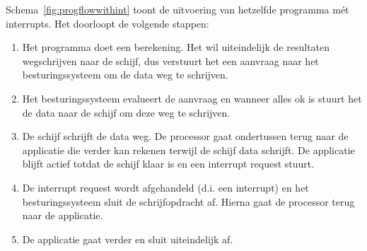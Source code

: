 Schema~\ref{fig:progflowwithint} toont de uitvoering van hetzelfde programma m\'et interrupts. Het doorloopt de volgende stappen:

\begin{enumerate}
\item Het programma doet een berekening. Het wil uiteindelijk de resultaten wegschrijven naar de schijf, dus verstuurt het een aanvraag naar het besturingssysteem om de data weg te schrijven.
\item Het besturingssysteem evalueert de aanvraag en wanneer alles ok is stuurt het de data naar de schijf om deze weg te schrijven.
\item De schijf schrijft de data weg. De processor gaat ondertussen terug naar de applicatie die verder kan rekenen terwijl de schijf data schrijft. De applicatie blijft actief totdat de schijf klaar is en een interrupt request stuurt.
\item De interrupt request wordt afgehandeld (d.i. een interrupt) en het besturingssysteem sluit de schrijfopdracht af. Hierna gaat de processor terug naar de applicatie.
\item De applicatie gaat verder en sluit uiteindelijk af.
\end{enumerate}

